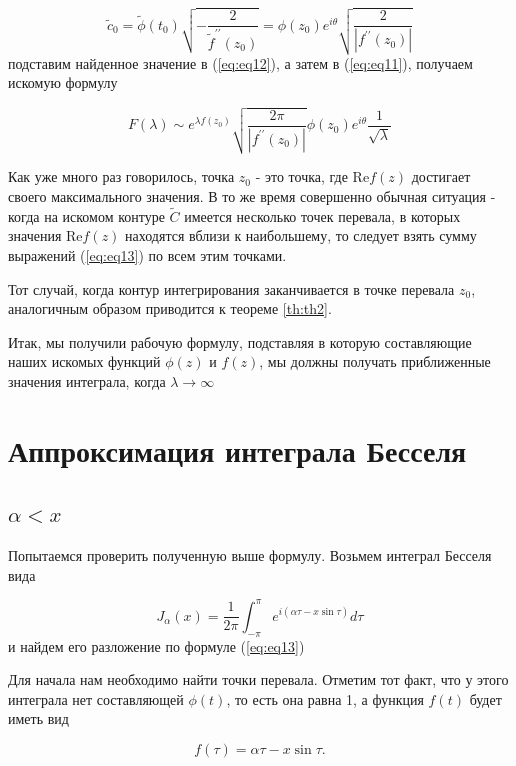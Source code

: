 \documentclass[14pt]{extarticle}
\renewcommand{\Re}{\mathrm{Re}}
\begin{document}
\begin{equation}\nonumber
\widetilde{c}_0=\widetilde{\phi}(t_0) \sqrt{-\frac{2}{\widetilde{f}^{\prime\prime}(z_0)}}= \phi (z_0) e^{i \theta} \sqrt{\frac{2}{|f^{\prime\prime}(z_0)|}}
\end{equation}
подставим найденное значение в (\ref{eq:eq12}), а затем в (\ref{eq:eq11}), получаем искомую формулу

\begin{equation}\label{eq:eq13}
F(\lambda) \sim e^{\lambda f (z_0)}\sqrt{\frac{2\pi}{|f^{\prime \prime} (z_0)|}} \phi(z_0) e^{i \theta} \frac{1}{\sqrt{\lambda}}
\end{equation}

Как уже много раз говорилось, точка $z_0$ - это точка, где $\Re f(z)$ достигает своего максимального значения. В то же время совершенно обычная ситуация - когда на искомом контуре $\widetilde{C}$ имеется несколько точек перевала, в которых значения $\Re f (z)$ находятся вблизи к наибольшему, то следует взять сумму выражений (\ref{eq:eq13}) по всем этим точками. 

Тот случай, когда контур интегрирования заканчивается в точке перевала $z_0$, аналогичным образом приводится к теореме \ref{th:th2}.

Итак, мы получили рабочую формулу, подставляя в которую составляющие наших искомых функций $\phi (z)$ и $f (z)$, мы должны получать приближенные значения интеграла, когда $\lambda \rightarrow \infty$ 

\section{Аппроксимация интеграла Бесселя}
\subsection{$\alpha<x$}
Попытаемся проверить полученную выше формулу. Возьмем интеграл Бесселя вида 

\begin{equation}\label{eq:eq14}
J_\alpha(x)=\frac{1}{2\pi}\int_{-\pi}^{\pi}e^{i(\alpha\tau-x\sin\tau)}d\tau
\end{equation} 
и найдем его разложение по формуле (\ref{eq:eq13})

Для начала нам необходимо найти точки перевала. Отметим тот факт, что у этого интеграла нет составляющей $\phi(t)$, то есть она равна 1, а функция $f(t)$ будет иметь вид 

\begin{equation}\nonumber
f(\tau) = \alpha \tau - x \sin \tau.
\end{equation} 
\end{document}
